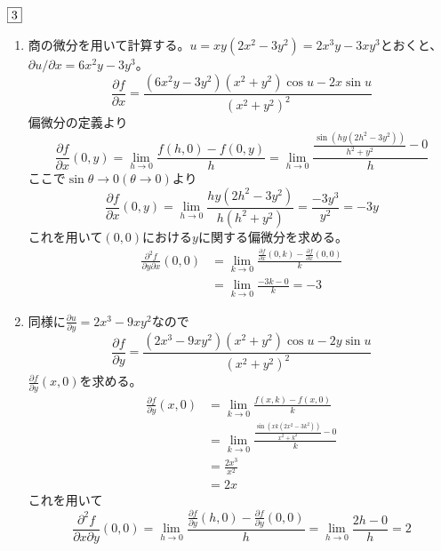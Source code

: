 \begin{souanswer} %
	$\fbox{3}$
\begin{enumerate}
	\item 商の微分を用いて計算する。$u= xy(2x^2- 3y^2)= 2x^3y- 3xy^3$とおくと、$\partial u/\partial x= 6x^2y- 3y^3$。
\begin{equation*}
	\frac{\partial f}{\partial x}= \frac{(6x^2y- 3y^2)(x^2+ y^2)\cos{u}- 2x\sin{u}}{(x^2+ y^2)^2}
\end{equation*}
	偏微分の定義より
\begin{equation*}
	\frac{\partial f}{\partial x}(0, y)= \lim_{h\to 0} \frac{f(h, 0)- f(0, y)}{h}= \lim_{h\to 0} \frac{\frac{\sin{(hy(2h^2- 3y^2))}}{h^2+ y^2}- 0}{h}
\end{equation*}
	ここで$\sin{\theta}\to 0(\theta\to 0)$より
\begin{equation*}
	\frac{\partial f}{\partial x}(0, y)= \lim_{h\to 0} \frac{hy(2h^2- 3y^2)}{h(h^2+ y^2)}= \frac{-3y^3}{y^2}= -3y
\end{equation*}
	これを用いて$(0, 0)$における$y$に関する偏微分を求める。
\begin{align*}
	\frac{\partial^2 f}{\partial y\partial x}(0, 0)
	&= \lim_{k\to 0} \frac{\frac{\partial f}{\partial x}(0, k)- \frac{\partial f}{\partial x}(0, 0)}{k}\\
	&=\lim_{k\to 0} \frac{-3k- 0}{k}= -3
\end{align*}

	\item 同様に$\frac{\partial u}{\partial y}= 2x^3-9xy^2$なので
\begin{equation*}
	\frac{\partial f}{\partial y}= \frac{(2x^3- 9xy^2)(x^2+ y^2)\cos{u}- 2y\sin{u}}{(x^2+ y^2)^2}
\end{equation*}
	$\frac{\partial f}{\partial y}(x, 0)$を求める。
\begin{align*}
	\frac{\partial f}{\partial y}(x, 0)
	&= \lim_{k\to 0} \frac{f(x, k)- f(x, 0)}{k}\\
	&= \lim_{k\to 0} \frac{\frac{\sin(xk(2x^2- 3k^2))}{x^2+ k^2}- 0}{k}\\
	&= \frac{2x^3}{x^2}\\
	&= 2x
\end{align*}
	これを用いて
\begin{equation*}
	\frac{\partial^2 f}{\partial x\partial y}(0, 0)= \lim_{h\to 0} \frac{\frac{\partial f}{\partial y}(h, 0)- \frac{\partial f}{\partial y}(0, 0)}{h}= \lim_{h\to 0} \frac{2h- 0}{h}= 2
\end{equation*}


\end{enumerate}
\end{souanswer}
